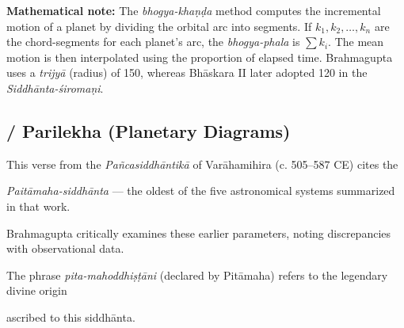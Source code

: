 \documentclass[10pt,a4paper]{article}
\newenvironment{engcommentary}
\newcommand{\bilingualverse}[2]{%

\noindent\begin{minipage}[t]{0.47\textwidth}

\dev{#1}

\end{minipage}%

\hfill\vline\hfill%

\begin{minipage}[t]{0.47\textwidth}

#2

\end{minipage}\par\vspace{0.8em}%

}
\begin{document}
\begin{engcommentary}

\textbf{Mathematical note:} The \textit{bhogya-khaṇḍa} method computes the incremental motion of a planet by dividing the orbital arc into segments. If $k_1, k_2, \dots, k_n$ are the chord-segments for each planet's arc, the \textit{bhogya-phala} is $\sum k_i$. The mean motion is then interpolated using the proportion of elapsed time. Brahmagupta uses a \textit{trijyā} (radius) of 150, whereas Bhāskara II later adopted 120 in the \textit{Siddhānta-śiromaṇi}.

\end{engcommentary}



\subsection*{ / Parilekha (Planetary Diagrams)}






\begin{engcommentary}

This verse from the \textit{Pañcasiddhāntikā} of Varāhamihira (c. 505--587 CE) cites the

\textit{Paitāmaha-siddhānta} --- the oldest of the five astronomical systems summarized in that work.

Brahmagupta critically examines these earlier parameters, noting discrepancies with observational data.

The phrase \textit{pita-mahoddhiṣṭāni} (declared by Pitāmaha) refers to the legendary divine origin

ascribed to this siddhānta.

\end{engcommentary}
\end{document}
